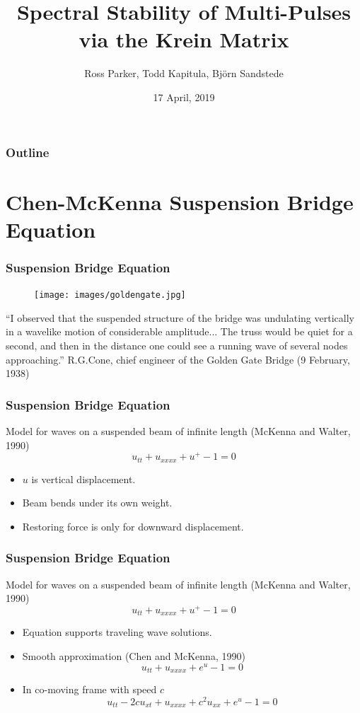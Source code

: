 \documentclass[16pt]{beamer}
\title[Multi-Pulse Stability]{Spectral Stability of Multi-Pulses via the Krein Matrix}
\author[R. Parker]{Ross Parker, Todd Kapitula, Bj{\"o}rn Sandstede}
\institute{Division of Applied Mathematics, Brown University\\
Department of Mathematics and Statistics, Calvin College}
\date{17 April, 2019}
\begin{document}
 
\frame{\titlepage}
 
\begin{frame}
\frametitle{Outline}
\tableofcontents
\end{frame}

\section{Chen-McKenna Suspension Bridge Equation}

\begin{frame}
	\frametitle{Suspension Bridge Equation}
		\begin{figure}
	    \begin{center}
	    \texttt{[image: images/goldengate.jpg]}
	    \end{center}
	    \end{figure}
		``I observed that the suspended structure of the bridge was undulating vertically in a wavelike motion of considerable amplitude... The truss would be quiet for a second, and then in the distance one could see a running wave of several nodes approaching.'' \textendash \: R.G.Cone, chief engineer of the
	    Golden Gate Bridge (9 February, 1938)
\end{frame}

\begin{frame}
	\frametitle{Suspension Bridge Equation}
		Model for waves on a suspended beam of infinite length (McKenna and Walter, 1990)
     	\[ u_{tt} + u_{xxxx} + u^+ - 1 = 0 \]
     \begin{itemize}
     	\item $u$ is vertical displacement.
     	\item Beam bends under its own weight.
     	\item Restoring force is only for downward displacement.
     \end{itemize}
 
\end{frame}

\begin{frame}
	\frametitle{Suspension Bridge Equation}   
		Model for waves on a suspended beam of infinite length (McKenna and Walter, 1990)
     	\[ u_{tt} + u_{xxxx} + u^+ - 1 = 0 \]
	\begin{itemize}
        \item Equation supports traveling wave solutions.
        \item Smooth approximation (Chen and McKenna, 1990)
            \[ u_{tt} + u_{xxxx} + e^{u} - 1 = 0 \]
        \item In co-moving frame with speed $c$
            \[ u_{tt} - 2 c u_{x t} + u_{xxxx} + c^2 u_{xx} + e^{u} - 1 = 0 \]
	\end{itemize}
\end{frame}
\end{document}
